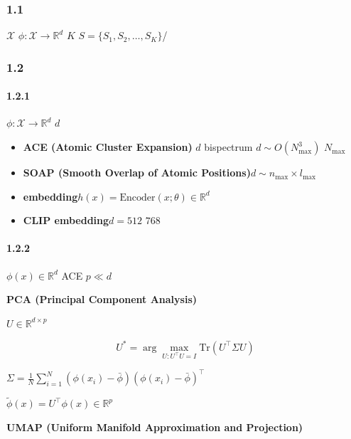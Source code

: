 \documentclass[
  12pt,
]{article}
\providecommand{\tightlist}{%
  \setlength{\itemsep}{0pt}\setlength{\parskip}{0pt}}
\begin{document}
\subsubsection{1.1 }\label{ux95eeux9898ux8bbeux5b9a}

 \(\mathcal{X}\)
\(\phi: \mathcal{X} \to \mathbb{R}^d\)
\(K\) \textbf{}
\(S = \{S_1, S_2, \dots, S_K\}\)/

\subsubsection{1.2 }\label{ux6570ux5b66ux6a21ux578b}

\paragraph{1.2.1 }\label{ux8868ux793aux6620ux5c04}


\(\phi: \mathcal{X} \to \mathbb{R}^d\) \(d\)


\begin{itemize}
\tightlist
\item
  \textbf{ACE (Atomic Cluster Expansion)} \(d\) 
  bispectrum \(d \sim O(N_{\text{max}}^3)\) 
  \(N_{\text{max}}\) 
\item
  \textbf{SOAP (Smooth Overlap of Atomic
  Positions)}\(d \sim n_{\text{max}} \times l_{\text{max}}\)
\item
  \textbf{
  embedding}\(h(x) = \text{Encoder}(x; \theta) \in \mathbb{R}^d\)
\item
  \textbf{CLIP embedding}\(d = 512\)  \(768\)
\end{itemize}

\paragraph{1.2.2 }\label{ux964dux7ef4}

 \(\phi(x) \in \mathbb{R}^d\) ACE
 \(p \ll d\) 

\textbf{PCA (Principal Component Analysis)}

 \(U \in \mathbb{R}^{d \times p}\) 

\[
U^* = \arg\max_{U: U^\top U = I} \text{Tr}(U^\top \Sigma U)
\]


\(\Sigma = \frac{1}{N} \sum_{i=1}^N (\phi(x_i) - \bar{\phi})(\phi(x_i) - \bar{\phi})^\top\)

\(\tilde{\phi}(x) = U^\top \phi(x) \in \mathbb{R}^p\)

\textbf{UMAP (Uniform Manifold Approximation and Projection)}
\end{document}
